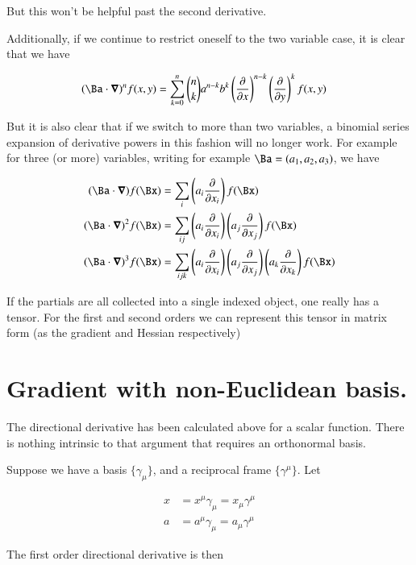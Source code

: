 \documentclass{article}
\begin{document}
But this won't be helpful past the second derivative.

Additionally, if we continue to restrict oneself to the two variable case, 
it is clear that we have

\begin{align}
(\Ba \cdot \spacegrad)^n f(x,y) 
&=
\sum_{k=0}^{n} \binom{n}{k} a^{n-k} b^{k} 
\left( \PD{x}{} \right)^{n-k}
\left( \PD{y}{} \right)^{k} f(x,y)
\end{align}

But it is also clear that if we switch to more than two variables, a binomial 
series expansion of derivative powers in this fashion will no longer work.  For
example for three (or more) variables, writing for example $\Ba = (a_1, a_2, a_3)$,
we have

\begin{align}
(\Ba \cdot \spacegrad) f(\Bx)
&=
\sum_{i} 
\left( a_i \PD{x_i}{} \right)
f(\Bx) \\
(\Ba \cdot \spacegrad)^2 f(\Bx) 
&=
\sum_{ij} 
\left( a_i \PD{x_i}{} \right)
\left( a_j \PD{x_j}{} \right)
f(\Bx) \\
(\Ba \cdot \spacegrad)^3 f(\Bx) 
&=
\sum_{ijk} 
\left( a_i \PD{x_i}{} \right)
\left( a_j \PD{x_j}{} \right)
\left( a_k \PD{x_k}{} \right)
f(\Bx) 
\end{align}

If the partials are all collected into a single indexed object, one really has a tensor.  For the first and second orders we
can represent this tensor in matrix form (as the gradient and Hessian respectively)

\section{ Gradient with non-Euclidean basis. }

The directional derivative has been calculated above for a scalar function.  There is nothing intrinsic to that argument
that requires an orthonormal basis.

Suppose we have a basis $\{\gamma_\mu\}$, and a reciprocal frame $\{\gamma^\mu\}$.  Let

\begin{align*}
x &= x^\mu \gamma_\mu = x_\mu \gamma^\mu \\
a &= a^\mu \gamma_\mu = a_\mu \gamma^\mu 
\end{align*}

The first order directional derivative is then 
\end{document}
